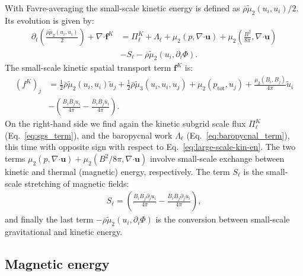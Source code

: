 \documentclass[]{article}
\newcommand{\bcdot}{\bm{\cdot}}
\begin{document}
With Favre-averaging the small-scale kinetic energy is defined as $\overline{\rho} \tilde{\mu}_2 (u_i, u_i) / 2$. Its evolution is given by:
%
\begin{align}
	\partial_t \left( \frac{\overline{\rho} \tilde{\mu}_2 (u_i, u_i)}{2}\right) + \nabla \bcdot \bm f^K &= \Pi^K_{\ell} + \Lambda_{\ell} + \mu_2 \left(p, \nabla \bcdot \bm u\right) + \mu_2 \left( \frac{B^2}{8 \pi}, \nabla \bcdot \bm u \right) \nonumber \\
	&- S_{\ell} - \overline{\rho} \tilde{\mu}_2 (u_i, \partial_i \Phi).
\end{align}
%
The small-scale kinetic spatial transport term $\bm f^{K}$ is:
%
\begin{align}
	(f^{K})_j &= \frac{1}{2} \overline{\rho} \tilde{\mu}_2 (u_i, u_i) \tilde{u}_j + \frac{1}{2} \overline{\rho} \tilde{\mu}_3 (u_i, u_i, u_j) + \mu_2 (p_{\mathrm{tot}}, u_j) + \frac{\mu_2 (B_i, B_j) }{4\pi}\tilde{u}_i \nonumber \\
	&- \left( \frac{\overline{B_i B_j u_i}}{4\pi} - \frac{\overline{B}_i \overline{B}_j \overline{u}_i}{4\pi} \right).
\end{align}
%
On the right-hand side we find again the kinetic subgrid scale flux $\Pi^K_{\ell}$ (Eq.~\ref{eq:sgs_term}), and the baropycnal work $\Lambda_{\ell}$ (Eq.~\ref{eq:baropycnal_term}), this time with opposite sign with respect to Eq.~\eqref{eq:large-scale-kin-en}. The two terms $ \mu_2 \left(p, \nabla \bcdot \bm u\right) + \mu_2 \left( B^2 /8 \pi, \nabla \bcdot \bm u \right)$ involve small-scale exchange between kinetic and thermal (magnetic) energy, respectively. 
The term $S_{\ell}$ is the small-scale stretching of magnetic fields:
%
\begin{align}
	S_{\ell} = \left( \frac{\overline{B_i B_j \partial_j u_i}}{4\pi} - \frac{\overline{B}_i \overline{B}_j \partial_j \overline{u}_i}{4\pi} \right),
\end{align}
%
and finally the last term $- \overline{\rho} \tilde{\mu}_2 (u_i, \partial_i \Phi)$ is the conversion between small-scale gravitational and kinetic energy.

\subsection{Magnetic energy}
\end{document}
